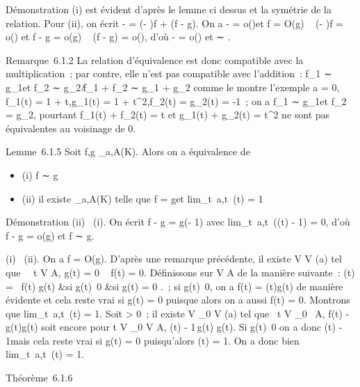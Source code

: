 \documentclass[]{article}
\begin{document}
Démonstration (i) est évident d'après le lemme ci dessus et la symétrie
de la relation. Pour (ii), on écrit \phif - \psig = (\phi - \psi)f + \psi(f - g). On a
\phi - \psi = o(\psi)\text et f = O(g) \rigtharrow~ (\phi - \psi)f = o(\psig) et f
- g = o(g) \rigtharrow~ \psi(f - g) = o(\psig), d'où \phif - \psig = o(\psig) et \phif ∼ \psig.

Remarque~6.1.2 La relation d'équivalence est donc compatible avec la
multiplication~; par contre, elle n'est pas compatible avec l'addition~:
f\_1 ∼ g\_1\text et f\_2 ∼
g\_2\rigtharrow~̸f\_1 + f\_2 ∼ g\_1 + g\_2
comme le montre l'exemple a = 0, f\_1(t) = 1 + t,g\_1(t)
= 1 + t^2,f\_2(t) = g\_2(t) = -1~; on a
f\_1 ∼ g\_1\text et f\_2 =
g\_2, pourtant f\_1(t) + f\_2(t) = t et
g\_1(t) + g\_2(t) = t^2 ne sont pas
équivalentes au voisinage de 0.

Lemme~6.1.5 Soit f,g \_a,A(K). Alors on a équivalence de

\begin{itemize}
\itemsep1pt\parskip0pt
\item
  (i) f ∼ g
\item
  (ii) il existe \phi {}\_a,A(K) telle que f = g\phi et
  lim\_t\rightarrow~a,t\inA~\phi(t) = 1
\end{itemize}

Démonstration (ii) \rigtharrow~(i). On écrit f - g = g(\phi - 1) avec
lim\_t\rightarrow~a,t\inA~(\phi(t) - 1) = 0, d'où f - g
= o(g) et f ∼ g.

(i) \rigtharrow~(ii). On a f = O(g). D'après une remarque précédente, il existe V \in
V (a) tel que \forall~~t \in V \bigcap A, g(t) = 0 \rigtharrow~ f(t) = 0.
Définissons \phi sur V \bigcap A de la manière suivante~: \phi(t) =
\left \ \cases  f(t)
\over g(t) &si g(t)\neq~0
 &si g(t) = 0  \right .~; si
g(t)\neq~0, on a f(t) = \phi(t)g(t) de manière
évidente et cela reste vrai si g(t) = 0 puisque alors on a aussi f(t) =
0. Montrons que lim\_t\rightarrow~a,t\inA~\phi(t) = 1.
Soit \epsilon \textgreater{} 0~; il existe V \_0 \in V (a) tel que
\forall~t \in V \_0~ \bigcap A, \textbar{}f(t) -
g(t)\textbar{}\leq \epsilon\textbar{}g(t)\textbar{} soit encore pour t \in V
\_0 \bigcap V \bigcap A, \textbar{}\phi(t) -
1\textbar{}\,\textbar{}g(t)\textbar{}\leq
\epsilon\textbar{}g(t)\textbar{}. Si g(t)\neq~0 on a
donc \textbar{}\phi(t) - 1\textbar{}\leq \epsilon mais cela reste vrai si g(t) = 0
puisqu'alors \phi(t) = 1. On a donc bien
lim\_t\rightarrow~a,t\inA~\phi(t) = 1.

Théorème~6.1.6
\end{document}
